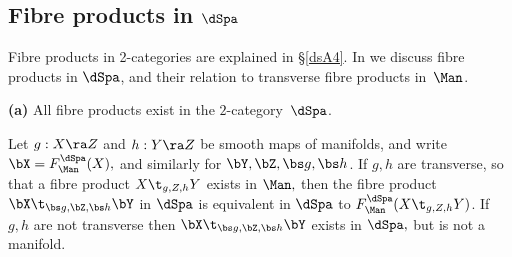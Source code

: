 \documentclass{article}
\begin{document}
\subsection{Fibre products in $\dSpa$}
\label{ds33}

Fibre products in 2-categories are explained in \S\ref{dsA4}. In
\cite[\S 2.5--\S 2.6]{Joyc6} we discuss fibre products in $\dSpa$,
and their relation to transverse fibre products in~$\Man$.

\begin{thm}{\bf(a)} All fibre products exist in the
$2$-category~$\dSpa$.
\smallskip

 Let\/ $g:X\ra Z$ and\/ $h:Y\ra Z$ be smooth maps
of manifolds, and write\/ $\bX=F_\Man^\dSpa(X),$ and similarly for
$\bY,\bZ,\bs g,\bs h$. If\/ $g,h$ are transverse, so that a fibre
product $X\t_{g,Z,h}Y$ exists in $\Man,$ then the fibre product\/
$\bX\t_{\bs g,\bZ,\bs h}\bY$ in $\dSpa$ is equivalent in $\dSpa$
to\/ $F_\Man^\dSpa(X\t_{g,Z,h}Y)$. If\/ $g,h$ are not transverse
then $\bX\t_{\bs g,\bZ,\bs h}\bY$ exists in $\dSpa,$ but is not a
manifold.
\label{ds3thm4}
\end{thm}
\end{document}
